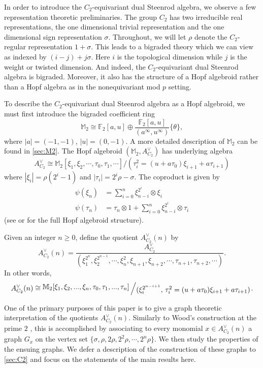 \documentclass{amsart}
\theoremstyle{definition}
\theoremstyle{plain}
\numberwithin{theorem}{section}
\numberwithin{equation}{section}
\numberwithin{figure}{section}
\newcommand{\mF}{{\mathbb F}}
\newcommand{\mM}{{\mathbb M}}
\newcommand{\0}{\langle 0 \rangle }
\newcommand{\bigslant}[2]{{\raisebox{.2em}{$#1$}\left/\raisebox{-.2em}{$#2$}\right.}}
\begin{document}
In order to introduce the $C_2$-equivariant dual Steenrod algebra, we observe a few representation theoretic preliminaries. The group $C_2$ has two irreducible real representations, the one dimensional trivial representation and the one dimensional sign representation $\sigma$. Throughout, we will let $\rho$ denote the $C_2$-regular representation $1 + \sigma$. This leads to a bigraded theory which we can view as indexed by ${(i-j) + j \sigma}$. Here $i$ is the topological dimension while $j$ is the weight or twisted dimension. And indeed, the $C_2$-equivariant dual Steenrod algebra is bigraded. Moreover, it also has the structure of a Hopf algebroid rather than a Hopf algebra as in the nonequivariant mod $p$ setting. 

To describe the $C_2$-equivariant dual Steenrod algebra as a Hopf algebroid, we must first introduce the bigraded coefficient ring 
\[
\mM_2 \cong \mF_2[a,u] \oplus \frac{\mF_2[a,u]}{(a^\infty, u^\infty)} \{ \theta \},
\]
where $|a|=(-1,-1)$, $|u|=(0,-1)$. A more detailed description of $\mM_2$ can be found in \cref{sec:M2}. The Hopf algebroid $(\mM_2, A_{C_2}^\vee)$ has underlying algebra
\begin{equation} \label{eq:C2dualSteenrod}
A_{C_2}^\vee \cong \mM_2 [ \xi_1, \xi_2, \cdots, \tau_0, \tau_1, \cdots] / (\tau_i^2 = (u + a\tau_0)\xi_{i + 1} + a \tau_{i + 1})
\end{equation}
where $| \xi_i |  = \rho(2^i - 1)$ and $| \tau_i | = 2^i \rho - \sigma$. The coproduct is given by 
\begin{align*}
    \psi(\xi_n) & = \sum_{i=0}^n \xi_{n - i}^{2^i} \otimes \xi_i \\
    \psi(\tau_n) & = \tau_n \otimes 1 + \sum_{i = 0}^n \xi_{n - i}^{2^i} \otimes \tau_i
\end{align*}
(see \cite[Theorem 6.41]{HuKriz01} or \cite[Theorem 2.14]{LiShiWAngXu19} for the full Hopf algebroid structure). 

Given an integer $n \geq 0$, define the quotient $A_{C_2}^\vee (n)$ by
\[
A_{C_2}^\vee (n) = \frac{A_{C_2}^\vee}{(\xi_1^{2^n}, \xi_2^{2^{n-1}}, \cdots, \xi_n^2, \xi_{n + 1}, \xi_{n + 2}, \cdots, \tau_{n + 1}, \tau_{n + 2}, \cdots)}.
\]
In other words,
\[
A_{C_2}^\vee(n) \cong \bigslant{\mathbb{M}_2[\xi_1,\xi_2,..., \xi_n, \tau_0,\tau_1,..., \tau_n]}{(\xi_i^{2^{n-i+1}},\,\tau_i^2=(u+a\tau_0)\xi_{i+1}+a\tau_{i+1})}.
\]

One of the primary purposes of this paper is to give a graph theoretic interpretation of the quotients $A_{C_2}^\vee (n)$. Similarly to Wood's construction at the prime $2$ \cite[]{Wood98}, this is accomplished by associating to every monomial $x \in A_{C_2}^\vee (n)$ a graph $G_x$ on the vertex set $\{\sigma, \rho, 2\rho, 2^2 \rho, \cdots, 2^n \rho \}$. We then study the properties of the ensuing graphs. We defer a description of the construction of these graphs to \cref{sec:C2} and focus on the statements of the main results here. 
\end{document}
